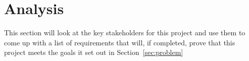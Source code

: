 
\section{Analysis}

This section will look at the key stakeholders for this project and use them to come up with a list of requirements that will, if completed, prove that this project meets the goals it set out in Section~\ref{sec:problem}



